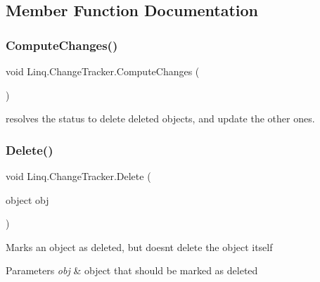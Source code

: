 \subsection{Member Function Documentation}
\mbox{\label{class_linq_1_1_change_tracker_a8274e4dca2ddc943c748deaca6e6a0a0}} 
\subsubsection{\texorpdfstring{Compute\+Changes()}{ComputeChanges()}}
{\footnotesize\ttfamily void Linq.\+Change\+Tracker.\+Compute\+Changes (\begin{DoxyParamCaption}{ }\end{DoxyParamCaption})\hspace{0.3cm}{\ttfamily [inline]}}



resolves the status to delete deleted objects, and update the other ones. 

\mbox{\label{class_linq_1_1_change_tracker_a6d14dc387040af11f769e348a98e77f9}} 
\subsubsection{\texorpdfstring{Delete()}{Delete()}}
{\footnotesize\ttfamily void Linq.\+Change\+Tracker.\+Delete (\begin{DoxyParamCaption}\item[{object}]{obj }\end{DoxyParamCaption})\hspace{0.3cm}{\ttfamily [inline]}}



Marks an object as deleted, but doesn\textquotesingle{}t delete the object itself 


\begin{DoxyParams}{Parameters}
{\em obj} & object that should be marked as deleted\\
\hline
\end{DoxyParams}
\mbox{\label{class_linq_1_1_change_tracker_a2e57cf68dc70deca33a3a9e5e7aa9184}} 
